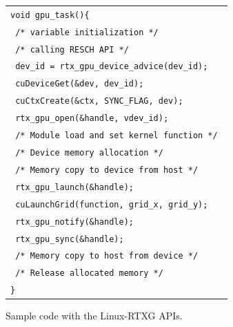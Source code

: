 \begin{figure}[!t]
\begin{center}
\begin{tabular}{l}
\hline\hline
{\scriptsize \verb|void gpu_task(){        |}\\
{\scriptsize \verb| /* variable initialization */ |}\\
{\scriptsize \verb| /* calling RESCH API */ |}\\
{\scriptsize \verb| dev_id = rtx_gpu_device_advice(dev_id); |}\\
{\scriptsize \verb| cuDeviceGet(&dev, dev_id); |}\\
{\scriptsize \verb| cuCtxCreate(&ctx, SYNC_FLAG, dev); |}\\
{\scriptsize \verb| rtx_gpu_open(&handle, vdev_id); |}\\
{\scriptsize \verb| /* Module load and set kernel function */ |}\\
{\scriptsize \verb| /* Device memory allocation */ |}\\
{\scriptsize \verb| /* Memory copy to device from host */ |}\\
{\scriptsize \verb| rtx_gpu_launch(&handle); |}\\
{\scriptsize \verb| cuLaunchGrid(function, grid_x, grid_y); |}\\
{\scriptsize \verb| rtx_gpu_notify(&handle); |}\\
{\scriptsize \verb| rtx_gpu_sync(&handle); |}\\
{\scriptsize \verb| /* Memory copy to host from device */ |}\\
{\scriptsize \verb| /* Release allocated memory */ |}\\
{\scriptsize \verb|}|}\\
\hline\hline
\end{tabular}
\caption{Sample code with the Linux-RTXG APIs.}
\vspace{-2mm}
\label{fig:sample}
\end{center}
\end{figure}

